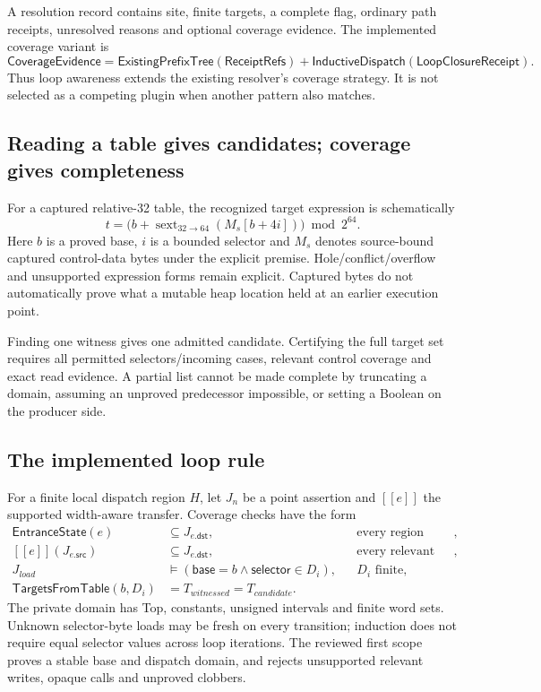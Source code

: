 \documentclass[11pt,a4paper]{article}
\newcommand{\ty}[1]{\mathsf{#1}}
\newcommand{\code}[1]{\texttt{\detokenize{#1}}}
\newcommand{\llbracket}{[\![}
\newcommand{\rrbracket}{]\!]}
\begin{document}
A resolution record contains site, finite targets, a complete flag, ordinary
path receipts, unresolved reasons and optional coverage evidence. The
implemented coverage variant is
\[
 \ty{CoverageEvidence}=\ty{ExistingPrefixTree}(\ty{ReceiptRefs})
 +\ty{InductiveDispatch}(\ty{LoopClosureReceipt}).
\]
Thus loop awareness extends the existing resolver's coverage strategy. It is
not selected as a competing plugin when another pattern also matches.

\subsection{Reading a table gives candidates; coverage gives completeness}
For a captured relative-32 table, the recognized target expression is
schematically
\[
 t=\bigl(b+\operatorname{sext}_{32\to64}(M_s[b+4i])\bigr)\bmod2^{64}.
\]
Here $b$ is a proved base, $i$ is a bounded selector and $M_s$ denotes
source-bound captured control-data bytes under the explicit
\code{FrozenCapturedControlData} premise. Hole/conflict/overflow and unsupported
expression forms remain explicit. Captured bytes do not automatically prove
what a mutable heap location held at an earlier execution point.

Finding one witness gives one admitted candidate. Certifying the full target
set requires all permitted selectors/incoming cases, relevant control
coverage and exact read evidence. A partial list cannot be made complete by
truncating a domain, assuming an unproved predecessor impossible, or setting
a Boolean on the producer side.

\subsection{The implemented loop rule}
For a finite local dispatch region $H$, let $J_n$ be a point assertion and
$\llbracket e\rrbracket$ the supported width-aware transfer. Coverage checks
have the form
\begin{align*}
 \ty{EntranceState}(e)&\subseteq J_{e.\ty{dst}},
       &&\text{every region entrance},\\
 \llbracket e\rrbracket(J_{e.\ty{src}})&\subseteq J_{e.\ty{dst}},
       &&\text{every relevant internal edge},\\
 J_{load}&\models(\ty{base}=b\land\ty{selector}\in D_i),
       &&D_i\text{ finite},\\
 \ty{TargetsFromTable}(b,D_i)&=T_{witnessed}=T_{candidate}.
\end{align*}
The private domain has Top, constants, unsigned intervals and finite word
sets. Unknown selector-byte loads may be fresh on every transition; induction
does not require equal selector values across loop iterations. The reviewed
first scope proves a stable base and dispatch domain, and rejects unsupported
relevant writes, opaque calls and unproved clobbers.
\end{document}
